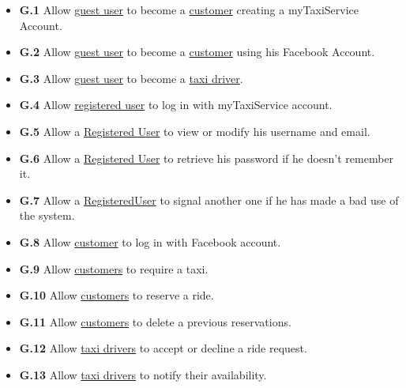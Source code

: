 		\begin{itemize}
			\item \textbf{\lbrack G.1\rbrack}\label{sec:g1} Allow \hyperref[sec:normaluser]{guest user} to become a \hyperref[sec:customer]{customer} creating a myTaxiService Account.

			\item \textbf{\lbrack G.2\rbrack}\label{sec:g2} Allow \hyperref[sec:normaluser]{guest user} to become a \hyperref[sec:customer]{customer} using his Facebook Account.

			\item \textbf{\lbrack G.3\rbrack}\label{sec:g3} Allow \hyperref[sec:normaluser]{guest user} to become a \hyperref[sec:tdriver]{taxi driver}.

			\item \textbf{\lbrack G.4\rbrack}\label{sec:g4} Allow \hyperref[sec:ruser]{registered user} to log in with myTaxiService account.

			\item \textbf{\lbrack G.5\rbrack}\label{sec:g5} Allow a \hyperref[sec:normaluser]{Registered User} to view or modify his username and email.

			\item \textbf{\lbrack G.6\rbrack}\label{sec:g6} Allow a \hyperref[sec:normaluser]{Registered User} to retrieve his password if he doesn't remember it.

			\item \textbf{\lbrack G.7\rbrack}\label{sec:g7} Allow a \hyperref[sec:normaluser]{RegisteredUser} to signal another one if he has made a bad use of the system.

			\item \textbf{\lbrack G.8\rbrack}\label{sec:g8} Allow \hyperref[sec:customer]{customer} to log in with Facebook account.

			\item \textbf{\lbrack G.9\rbrack}\label{sec:g9} Allow \hyperref[sec:customer]{customers} to require a taxi.

			\item \textbf{\lbrack G.10\rbrack}\label{sec:g10} Allow \hyperref[sec:customer]{customers} to reserve a ride.

			\item \textbf{\lbrack G.11\rbrack}\label{sec:g11} Allow \hyperref[sec:customer]{customers} to delete a previous reservations.

			\item \textbf{\lbrack G.12\rbrack}\label{sec:g12} Allow \hyperref[sec:tdriver]{taxi drivers} to accept or decline a ride request.

			\item \textbf{\lbrack G.13\rbrack}\label{sec:g13} Allow \hyperref[sec:tdriver]{taxi drivers} to notify their availability.
		\end{itemize}
		
